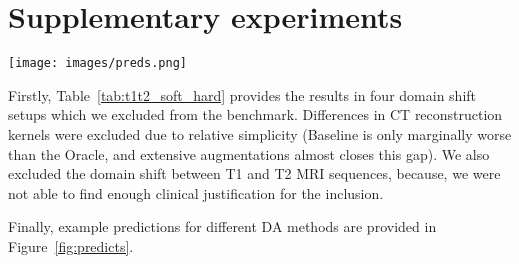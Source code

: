 

\section{Supplementary experiments}

\begin{figure*}[h]
    \centering
    \texttt{[image: images/preds.png]}
    \caption{Example predictions for different DA methods. Methods are in rows, starting with ground truth in a first row. All eight benchmark tasks are in columns.}
    \label{fig:predicts}
\end{figure*}



Firstly, Table~\ref{tab:t1t2_soft_hard} provides the results in four domain shift setups which we excluded from the benchmark. Differences in CT reconstruction kernels were excluded due to relative simplicity (Baseline is only marginally worse than the Oracle, and extensive augmentations almost closes this gap). We also excluded the domain shift between T1 and T2 MRI sequences, because, we were not able to find enough clinical justification for the inclusion.

Finally, example predictions for different DA methods are provided in Figure~\ref{fig:predicts}.
